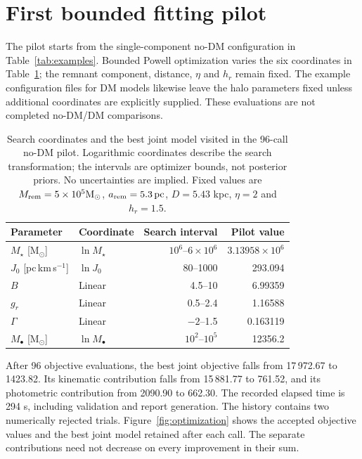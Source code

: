 \documentclass[11pt,a4paper]{article}
\newcommand{\Msun}{\mathrm{M}_{\odot}}
\newcommand{\pc}{\,\mathrm{pc}}
\begin{document}
\section{First bounded fitting pilot}
\label{sec:pilot}

The pilot starts from the single-component no-DM configuration in
Table~\ref{tab:examples}. Bounded Powell optimization varies the six
coordinates in Table~\ref{tab:pilotparams}; the remnant component, distance,
$\eta$ and $h_r$ remain fixed. The example configuration files for DM models
likewise leave the halo parameters fixed unless additional coordinates are
explicitly supplied. These evaluations are not completed no-DM/DM comparisons.

\begin{table}[htbp]
\centering\small
\caption{Search coordinates and the best joint model visited in the 96-call
no-DM pilot. Logarithmic coordinates describe the search transformation;
the intervals are optimizer bounds, not posterior priors. No uncertainties
are implied. Fixed values are $M_{\rm rem}=5\times10^5\Msun$,
$a_{\rm rem}=5.3\pc$, $D=5.43$ kpc, $\eta=2$ and $h_r=1.5$.}
\label{tab:pilotparams}
\begin{tabular}{llrr}
\toprule
Parameter & Coordinate & Search interval & Pilot value\\
\midrule
$M_\star$ [$\Msun$] & $\ln M_\star$ & $10^6$--$6\times10^6$ & $3.13958\times10^6$\\
$J_0$ [pc\,km\,s$^{-1}$] & $\ln J_0$ & 80--1000 & 293.094\\
$B$ & Linear & 4.5--10 & 6.99359\\
$g_r$ & Linear & 0.5--2.4 & 1.16588\\
$\Gamma$ & Linear & $-2$--1.5 & 0.163119\\
$M_\bullet$ [$\Msun$] & $\ln M_\bullet$ & $10^2$--$10^5$ & 12356.2\\
\bottomrule
\end{tabular}
\end{table}

After 96 objective evaluations, the best joint objective falls from
17\,972.67 to 1423.82. Its kinematic contribution falls from 15\,881.77 to
761.52, and its photometric contribution from 2090.90 to 662.30.
The recorded elapsed time is 294 s, including validation and report generation.
The history contains two numerically rejected trials. Figure~\ref{fig:optimization}
shows the accepted objective values and the best joint model retained after
each call. The separate contributions need not decrease on every improvement
in their sum.
\end{document}
